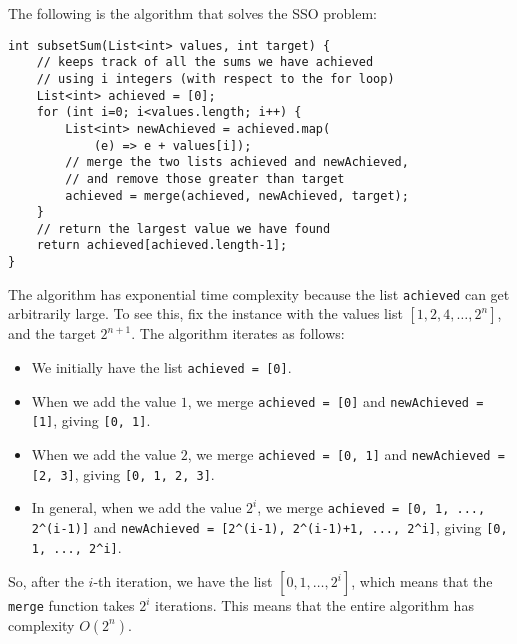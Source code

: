 \documentclass[a4paper, openany]{memoir}
\begin{document}
    The following is the algorithm that solves the SSO problem:
\begin{lstlisting}[language=pseudocode]
int subsetSum(List<int> values, int target) {
    // keeps track of all the sums we have achieved 
    // using i integers (with respect to the for loop)
    List<int> achieved = [0];
    for (int i=0; i<values.length; i++) {
        List<int> newAchieved = achieved.map(
            (e) => e + values[i]);
        // merge the two lists achieved and newAchieved,
        // and remove those greater than target
        achieved = merge(achieved, newAchieved, target);
    }
    // return the largest value we have found
    return achieved[achieved.length-1];
}
\end{lstlisting}
    \noindent The algorithm has exponential time complexity because the list \texttt{achieved} can get arbitrarily large. To see this, fix the instance with the values list $[1, 2, 4, \dots, 2^n]$, and the target $2^{n+1}$. The algorithm iterates as follows:
    \begin{itemize}
        \item We initially have the list \texttt{achieved = [0]}.
        \item When we add the value $1$, we merge \texttt{achieved = [0]} and \texttt{newAchieved = [1]}, giving \texttt{[0, 1]}.
        \item When we add the value $2$, we merge \texttt{achieved = [0, 1]} and \texttt{newAchieved = [2, 3]}, giving \texttt{[0, 1, 2, 3]}.
        \item In general, when we add the value $2^i$, we merge \texttt{achieved = [0, 1, ..., 2\textasciicircum(i-1)]} and \texttt{newAchieved = [2\textasciicircum(i-1), 2\textasciicircum(i-1)+1, ..., 2\textasciicircum i]}, giving \texttt{[0, 1, ..., 2\textasciicircum i]}.
    \end{itemize}
    So, after the $i$-th iteration, we have the list $[0, 1, \dots, 2^i]$, which means that the \texttt{merge} function takes $2^i$ iterations. This means that the entire algorithm has complexity $O(2^n)$. 
    
\end{document}
